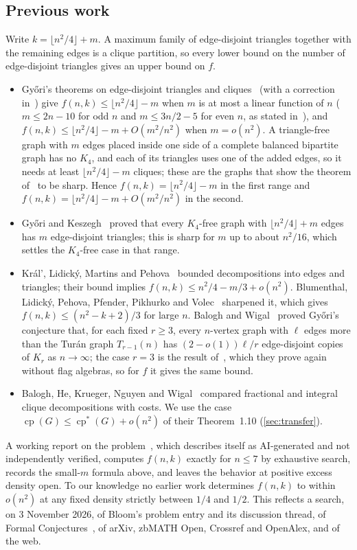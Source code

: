 \documentclass[10pt]{article}
\theoremstyle{definition}
\theoremstyle{remark}
\numberwithin{equation}{section}
\newcommand{\cp}{\operatorname{cp}}
\newcommand{\cps}{\operatorname{cp}^{*}}
\begin{document}
\subsection{Previous work}\label{sec:previous}
Write $k=\lfloor n^2/4\rfloor+m$. A maximum family of edge-disjoint triangles together with the remaining edges is a clique partition, so every lower bound on the number of edge-disjoint triangles gives an upper bound on $f$.
\begin{itemize}[leftmargin=1.5em]
\item Gy\H{o}ri's theorems on edge-disjoint triangles and cliques~\cite{Gy88,Gy91} (with a correction in~\cite{Gy92}) give $f(n,k)\le\lfloor n^2/4\rfloor-m$ when $m$ is at most a linear function of $n$ ($m\le2n-10$ for odd $n$ and $m\le3n/2-5$ for even $n$, as stated in~\cite{BLPPPV21,BaWi25}), and $f(n,k)\le\lfloor n^2/4\rfloor-m+O(m^2/n^2)$ when $m=o(n^2)$. A triangle-free graph with $m$ edges placed inside one side of a complete balanced bipartite graph has no $K_4$, and each of its triangles uses one of the added edges, so it needs at least $\lfloor n^2/4\rfloor-m$ cliques; these are the graphs that show the theorem of~\cite{GyKe17} to be sharp. Hence $f(n,k)=\lfloor n^2/4\rfloor-m$ in the first range and $f(n,k)=\lfloor n^2/4\rfloor-m+O(m^2/n^2)$ in the second.
\item Gy\H{o}ri and Keszegh~\cite{GyKe17} proved that every $K_4$-free graph with $\lfloor n^2/4\rfloor+m$ edges has $m$ edge-disjoint triangles; this is sharp for $m$ up to about $n^2/16$, which settles the $K_4$-free case in that range.
\item Kr\'al', Lidick\'y, Martins and Pehova~\cite{KLMP19} bounded decompositions into edges and triangles; their bound implies $f(n,k)\le n^2/4-m/3+o(n^2)$. Blumenthal, Lidick\'y, Pehova, Pfender, Pikhurko and Volec~\cite{BLPPPV21} sharpened it, which gives $f(n,k)\le(n^2-k+2)/3$ for large $n$. Balogh and Wigal~\cite{BaWi25} proved Gy\H{o}ri's conjecture that, for each fixed $r\ge3$, every $n$-vertex graph with $\ell$ edges more than the Tur\'an graph $T_{r-1}(n)$ has $(2-o(1))\ell/r$ edge-disjoint copies of $K_r$ as $n\to\infty$; the case $r=3$ is the result of~\cite{KLMP19}, which they prove again without flag algebras, so for $f$ it gives the same bound.
\item Balogh, He, Krueger, Nguyen and Wigal~\cite{BHKNW26} compared fractional and integral clique decompositions with costs. We use the case $\cp(G)\le\cps(G)+o(n^2)$ of their Theorem~1.10 (\cref{sec:transfer}).
\end{itemize}
A working report on the problem~\cite{EPaD}, which describes itself as AI-generated and not independently verified, computes $f(n,k)$ exactly for $n\le7$ by exhaustive search, records the small-$m$ formula above, and leaves the behavior at positive excess density open. To our knowledge no earlier work determines $f(n,k)$ to within $o(n^2)$ at any fixed density strictly between $1/4$ and $1/2$. This reflects a search, on 3 November 2026, of Bloom's problem entry and its discussion thread, of Formal Conjectures~\cite{FC}, of arXiv, zbMATH Open, Crossref and OpenAlex, and of the web.
\end{document}
